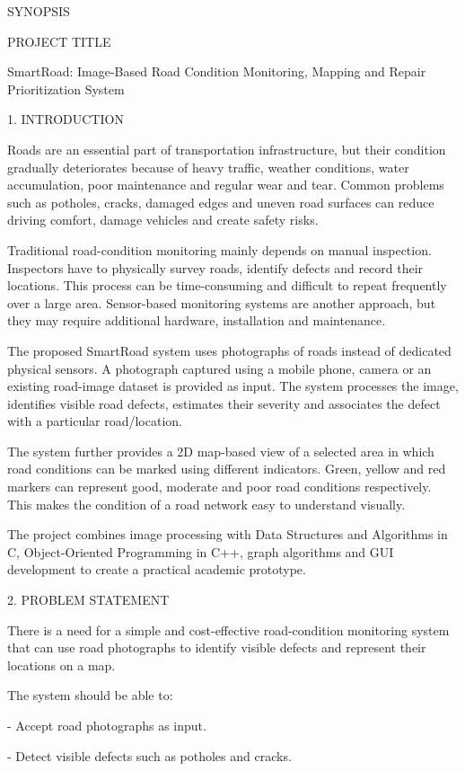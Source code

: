 \documentclass[
]{article}
\author{}
\date{}
\begin{document}
SYNOPSIS

PROJECT TITLE

SmartRoad: Image-Based Road Condition Monitoring, Mapping and Repair
Prioritization System

1. INTRODUCTION

Roads are an essential part of transportation infrastructure, but their
condition gradually deteriorates because of heavy traffic, weather
conditions, water accumulation, poor maintenance and regular wear and
tear. Common problems such as potholes, cracks, damaged edges and uneven
road surfaces can reduce driving comfort, damage vehicles and create
safety risks.

Traditional road-condition monitoring mainly depends on manual
inspection. Inspectors have to physically survey roads, identify defects
and record their locations. This process can be time-consuming and
difficult to repeat frequently over a large area. Sensor-based
monitoring systems are another approach, but they may require additional
hardware, installation and maintenance.

The proposed SmartRoad system uses photographs of roads instead of
dedicated physical sensors. A photograph captured using a mobile phone,
camera or an existing road-image dataset is provided as input. The
system processes the image, identifies visible road defects, estimates
their severity and associates the defect with a particular
road/location.

The system further provides a 2D map-based view of a selected area in
which road conditions can be marked using different indicators. Green,
yellow and red markers can represent good, moderate and poor road
conditions respectively. This makes the condition of a road network easy
to understand visually.

The project combines image processing with Data Structures and
Algorithms in C, Object-Oriented Programming in C++, graph algorithms
and GUI development to create a practical academic prototype.

2. PROBLEM STATEMENT

There is a need for a simple and cost-effective road-condition
monitoring system that can use road photographs to identify visible
defects and represent their locations on a map.

The system should be able to:

- Accept road photographs as input.

- Detect visible defects such as potholes and cracks.
\end{document}
